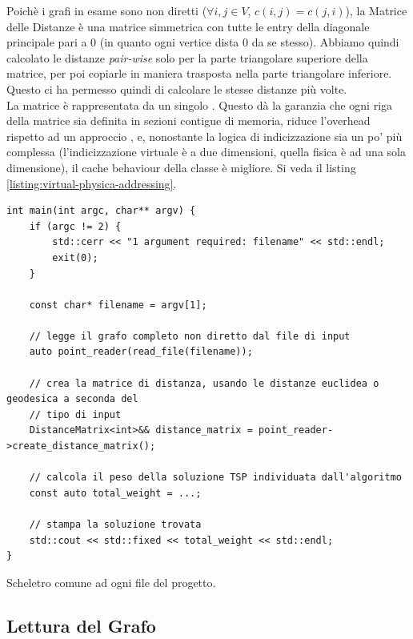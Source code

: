 \noindent Poichè i grafi in esame sono non diretti ($\forall i,j \in V$, $c(i,j) = c(j,i)$), la Matrice delle Distanze è una matrice simmetrica con tutte le entry della diagonale principale pari a 0 (in quanto ogni vertice dista 0 da se stesso).
Abbiamo quindi calcolato le distanze \textit{pair-wise} solo per la parte triangolare superiore della matrice, per poi copiarle in maniera trasposta nella parte triangolare inferiore. Questo ci ha permesso quindi di calcolare le stesse distanze più volte. \\

\noindent La matrice è rappresentata da un singolo . Questo dà la garanzia che ogni riga della matrice sia definita in sezioni contigue di memoria, riduce l'overhead rispetto ad un approccio , e, nonostante la logica di indicizzazione sia un po' più complessa (l'indicizzazione virtuale è a due dimensioni, quella fisica è ad una sola dimensione), il cache behaviour della classe è migliore. Si veda il listing \ref{listing:virtual-physica-addressing}.

\begin{listing}[!ht]
\begin{verbatim}
int main(int argc, char** argv) {
    if (argc != 2) {
        std::cerr << "1 argument required: filename" << std::endl;
        exit(0);
    }

    const char* filename = argv[1];

    // legge il grafo completo non diretto dal file di input
    auto point_reader(read_file(filename));

    // crea la matrice di distanza, usando le distanze euclidea o geodesica a seconda del
    // tipo di input
    DistanceMatrix<int>&& distance_matrix = point_reader->create_distance_matrix();

    // calcola il peso della soluzione TSP individuata dall'algoritmo
    const auto total_weight = ...;

    // stampa la soluzione trovata
    std::cout << std::fixed << total_weight << std::endl;
}
\end{verbatim}
\caption{Scheletro comune ad ogni file  del progetto.}
\label{listing:main-cpp}
\end{listing}

\subsection{Lettura del Grafo}

